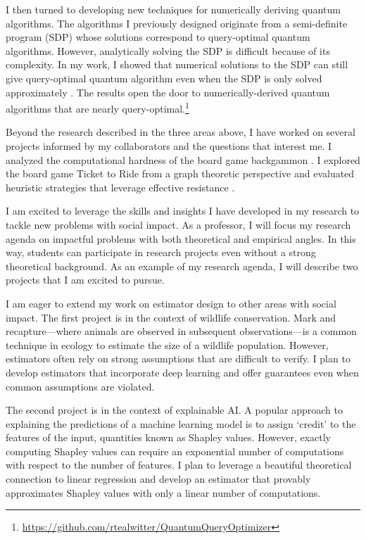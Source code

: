 \documentclass[11pt]{article}
\begin{document}
I then turned to developing new techniques for numerically deriving quantum algorithms.
The algorithms I previously designed originate from a semi-definite program (SDP) whose solutions correspond to query-optimal quantum algorithms.
However, analytically solving the SDP is difficult because of its complexity.
In my work, I showed that numerical solutions to the SDP can still give query-optimal quantum algorithm even when the SDP is only solved approximately \cite{czekanski2023robust}.
The results open the door to numerically-derived quantum algorithms that are nearly query-optimal.\footnote{\url{https://github.com/rtealwitter/QuantumQueryOptimizer}}

Beyond the research described in the three areas above, I have worked on several projects informed by my collaborators and the questions that interest me.
I analyzed the computational hardness of the board game backgammon \cite{witter2021backgammon}.
I explored the board game Ticket to Ride from a graph theoretic perspective and evaluated heuristic strategies that leverage effective resistance \cite{witter2020applications}.


I am excited to leverage the skills and insights I have developed in my research to tackle new problems with social impact.
As a professor, I will focus my research agenda on impactful problems with both theoretical and empirical angles.
In this way, students can participate in research projects even without a strong theoretical background.
As an example of my research agenda, I will describe two projects that I am excited to pursue.

I am eager to extend my work on estimator design to other areas with social impact.
The first project is in the context of wildlife conservation.
Mark and recapture---where animals are observed in subsequent observations---is a common technique in ecology to estimate the size of a wildlife population.
However, estimators often rely on strong assumptions that are difficult to verify.
I plan to develop estimators that incorporate deep learning and offer guarantees even when common assumptions are violated.

The second project is in the context of explainable AI.
A popular approach to explaining the predictions of a machine learning model is to assign `credit' to the features of the input, quantities known as Shapley values.
However, exactly computing Shapley values can require an exponential number of computations with respect to the number of features.
I plan to leverage a beautiful theoretical connection to linear regression and develop an estimator that provably approximates Shapley values with only a linear number of computations.
\end{document}
